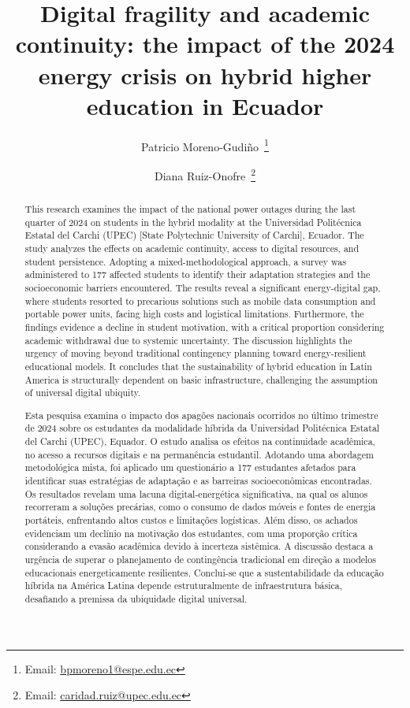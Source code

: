 \documentclass[english]{textolivre}
\title{Digital fragility and academic continuity: the impact of the 2024 energy crisis on hybrid higher education in Ecuador}
\author[1]{Patricio Moreno-Gudiño~\orcid{0000-0002-3184-4965}\thanks{Email: \href{mailto:bpmoreno1@espe.edu.ec}{bpmoreno1@espe.edu.ec}}}
\author[2]{Diana Ruiz-Onofre~\orcid{0000-0002-7121-1548}\thanks{Email: \href{mailto:caridad.ruiz@upec.edu.ec}{caridad.ruiz@upec.edu.ec}}}
\affil[1]{Universidad de las Fuerzas Armadas, Unidad de
Admisión, Sangolquí, Ecuador.}
\affil[2]{Universidad Politécnica Estatal del Carchi, Facultad de Ciencias de la Salud y Ciencias de la Educación, Carrera de Educación Básica, Tulcán, Ecuador.}
\begin{document}
\maketitle

\begin{polyabstract}
\begin{abstract}
This research examines the impact of the national power outages during the last quarter of 2024 on students in the hybrid modality at the Universidad Politécnica Estatal del Carchi (UPEC) [State Polytechnic University of Carchi], Ecuador. The study analyzes the effects on academic continuity, access to digital resources, and student persistence. Adopting a mixed-methodological approach, a survey was administered to 177 affected students to identify their adaptation strategies and the socioeconomic barriers encountered. The results reveal a significant energy-digital gap, where students resorted to precarious solutions such as mobile data consumption and portable power units, facing high costs and logistical limitations. Furthermore, the findings evidence a decline in student motivation, with a critical proportion considering academic withdrawal due to systemic uncertainty. The discussion highlights the urgency of moving beyond traditional contingency planning toward energy-resilient educational models. It concludes that the sustainability of hybrid education in Latin America is structurally dependent on basic infrastructure, challenging the assumption of universal digital ubiquity.

\end{abstract}

\begin{portuguese}
\begin{abstract}
Esta pesquisa examina o impacto dos apagões nacionais ocorridos no último trimestre de 2024 sobre os estudantes da modalidade híbrida da Universidad Politécnica Estatal del Carchi (UPEC), Equador. O estudo analisa os efeitos na continuidade acadêmica, no acesso a recursos digitais e na permanência estudantil. Adotando uma abordagem metodológica mista, foi aplicado um questionário a 177 estudantes afetados para identificar suas estratégias de adaptação e as barreiras socioeconômicas encontradas. Os resultados revelam uma lacuna digital-energética significativa, na qual os alunos recorreram a soluções precárias, como o consumo de dados móveis e fontes de energia portáteis, enfrentando altos custos e limitações logísticas. Além disso, os achados evidenciam um declínio na motivação dos estudantes, com uma proporção crítica considerando a evasão acadêmica devido à incerteza sistêmica. A discussão destaca a urgência de superar o planejamento de contingência tradicional em direção a modelos educacionais energeticamente resilientes. Conclui-se que a sustentabilidade da educação híbrida na América Latina depende estruturalmente de infraestrutura básica, desafiando a premissa da ubiquidade digital universal.


\end{abstract}
\end{portuguese}
\end{polyabstract}
\end{document}
